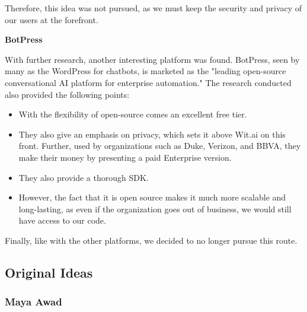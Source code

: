 \documentclass[titlepage, 12pt]{article}
\begin{document}
Therefore, this idea was not pursued, as we must keep the security and privacy of our users at the forefront.

\textbf{BotPress}

With further research, another interesting platform was found. BotPress, seen by many as the WordPress for chatbots, is marketed as the "leading open-source conversational AI platform for enterprise automation." The research conducted also provided the following points:

\begin{itemize}
    \item With the flexibility of open-source comes an excellent free tier.
    \item They also give an emphasis on privacy, which sets it above Wit.ai on this front. Further, used by organizations such as Duke, Verizon, and BBVA, they make their money by presenting a paid Enterprise version.
    \item They also provide a thorough SDK.
    \item However, the fact that it is open source makes it much more scalable and long-lasting, as even if the organization goes out of business, we would still have access to our code.
\end{itemize}

Finally, like with the other platforms, we decided to no longer pursue this route.






 


\subsection{Original Ideas}

\subsubsection{Maya Awad}
\end{document}
